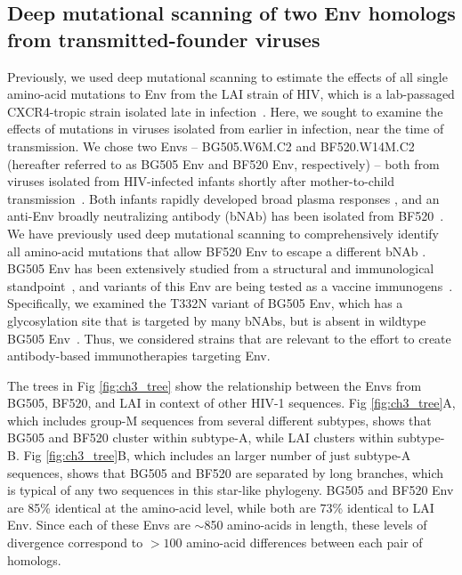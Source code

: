 \documentclass[9pt,lineno]{elife}
\begin{document}
\subsection*{Deep mutational scanning of two Env homologs from transmitted-founder viruses}
Previously, we used deep mutational scanning to estimate the effects of all single amino-acid mutations to Env from the LAI strain of HIV, which is a lab-passaged CXCR4-tropic strain isolated late in infection~\cite{peden1991changes,haddox2016experimental}.
Here, we sought to examine the effects of mutations in viruses isolated from earlier in infection, near the time of transmission.
We chose two Envs -- BG505.W6M.C2 and BF520.W14M.C2 (hereafter referred to as BG505 Env and BF520 Env, respectively) -- both from viruses isolated from HIV-infected infants shortly after mother-to-child transmission~\cite{goo2014early}.
Both infants rapidly developed broad plasma responses \cite{goo2014early}, and an anti-Env broadly neutralizing antibody (bNAb) has been isolated from BF520~\cite{simonich2016hiv}.
We have previously used deep mutational scanning to comprehensively identify all amino-acid mutations that allow BF520 Env to escape a different bNAb \cite{dingens2017comprehensive}.
BG505 Env has been extensively studied from a structural and immunological standpoint~\cite{julien2013crystal,lyumkis2013cryo,pancera2014structure,huang2014broad,falkowska2014broadly,sanders2015hiv,stewart2016trimeric}, and variants of this Env are being tested as a vaccine immunogens~\cite{sanders2013next,sanders2015hiv,de2015immunogenicity}.
Specifically, we examined the T332N variant of BG505 Env, which has a glycosylation site that is targeted by many bNAbs, but is absent in wildtype BG505 Env~\cite{sanders2013next}.
Thus, we considered strains that are relevant to the effort to create antibody-based immunotherapies targeting Env.

The trees in Fig \ref{fig:ch3_tree} show the relationship between the Envs from BG505, BF520, and LAI in context of other HIV-1 sequences.
Fig \ref{fig:ch3_tree}A, which includes group-M sequences from several different subtypes, shows that BG505 and BF520 cluster within subtype-A, while LAI clusters within subtype-B.
Fig \ref{fig:ch3_tree}B, which includes an larger number of just subtype-A sequences, shows that BG505 and BF520 are separated by long branches, which is typical of any two sequences in this star-like phylogeny.
BG505 and BF520 Env are 85\% identical at the amino-acid level, while both are 73\% identical to LAI Env.
Since each of these Envs are $\sim$850 amino-acids in length, these levels of divergence correspond to $>100$ amino-acid differences between each pair of homologs.
\end{document}
